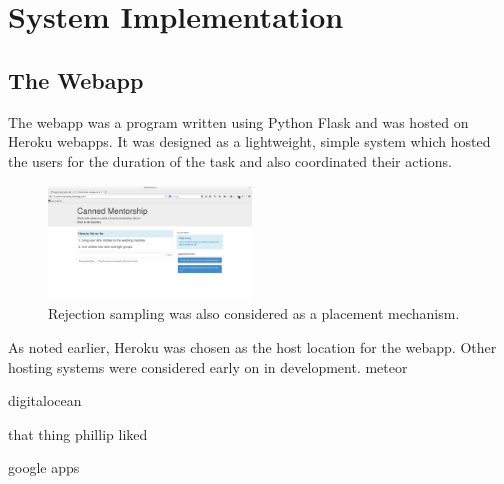 \section{System Implementation}

\subsection{The Webapp}
The webapp was a program written using Python Flask and was hosted on Heroku webapps. 
It was designed as a lightweight, simple system which hosted the users for the duration of the task and also coordinated their actions.

\begin{figure}[h]
	\begin{center}
		\includegraphics[width=0.48\textwidth]{figures/cmInterface.png}
		\caption{Rejection sampling was also considered as a placement mechanism.}
		\label{fig:rejection_sampling_placement}
	\end{center}
\end{figure}

As noted earlier, Heroku was chosen as the host location for the webapp.
Other hosting systems were considered early on in development. 
meteor

digitalocean

that thing phillip liked

google apps




%

